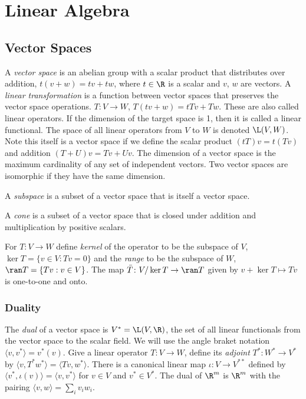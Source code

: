 \chapter{Linear Algebra}

\section{Vector Spaces}
A {\em vector space} is an abelian group with a scalar product that
distributes over addition, $t(v + w) = tv + tw$, where $t\in\R$ is a scalar
and $v$, $w$ are vectors. A {\em linear transformation} is a function
between vector spaces that preserves the vector space operations.
$T\colon V\to W$, $T(tv + w) = tTv + Tw$.
These are also called linear operators. If the dimension of the target space
is 1, then it is called a linear functional.
The space of all linear operators from $V$ to $W$ is denoted $\L(V,W)$.
Note this itself is a vector space if we define the scalar product
$(tT)v = t(Tv)$ and addition $(T + U)v = Tv + Uv$.
The dimension of a vector space is the
maximum cardinality of any set of independent vectors. Two vector
spaces are isomorphic if they have the same dimension.

A {\em subspace} is a subset of a vector space that is itself a vector space.

A {\em cone} is a subset of a vector space that is closed under
addition and multiplication by positive scalars. 

For $T\colon V\to W$ define {\em kernel} of the operator to be the subspace
of $V$, 
$\ker T = \{v\in V:Tv = 0\}$ and
the {\em range} to be the subspace of $W$, $\ran T = \{Tv:v\in V\}$.
The map $\bar T\colon V/\ker T\to\ran T$ given by 
$v + \ker T\mapsto Tv$ is one-to-one and onto.

\subsection{Duality}
The {\em dual} of a vector space is $V^* = \L(V,\R)$, the set of
all linear functionals from the vector space to the scalar field.
We will use the angle braket notation $\langle v, v^*\rangle =v^*(v)$. Give
a linear operator $T\colon V\to W$, define its {\em adjoint}
$T^*\colon W^*\to V^*$ by $\langle v, T^* w^*\rangle = \langle Tv, w^*\rangle$.
There is a canonical linear map $\iota\colon V\to V^{**}$ defined by
$\langle v^*, \iota(v)\rangle = \langle v, v^*\rangle$ for $v\in V$
and $v^*\in V^*$.
The dual of $\R^m$ is $\R^m$ with the pairing $\langle v,w\rangle
= \sum_i v_i w_i$.

